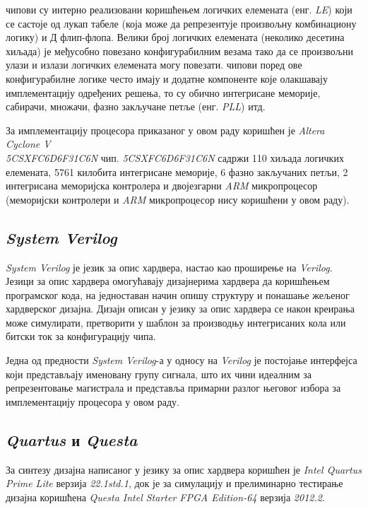  чипови су интерно реализовани коришћењем логичких елемената (енг. \textit{\acrfull{LE}}) који се састоје од лукап табеле (која може да репрезентује произвољну комбинациону логику) и Д флип-флопа.
Велики број логичких елемената (неколико десетина хиљада) је међусобно повезано конфигурабилним везама тако да се произвољни улази и излази логичких елемената могу повезати.
 чипови поред ове конфигурабилне логике често имају и додатне компоненте које олакшавају имплементацију одређених решења, то су обично интегрисане меморије, сабирачи, множачи, фазно закључане петље (енг. \textit{\acrfull{PLL}}) итд.

За имплементацију процесора приказаног у овом раду коришћен је \textit{Altera Cyclone V \\ 5CSXFC6D6F31C6N}\cite{cycv_hb}  чип.
\textit{5CSXFC6D6F31C6N} садржи 110 хиљада логичких елемената, 5761 килобита интегрисане меморије, 6 фазно закључаних петљи, 2 интегрисана меморијска контролера и двојезгарни \textit{ARM} микропроцесор (меморијски контролери и \textit{ARM} микропроцесор нису коришћени у овом раду). 

\subsection{\textit{System Verilog}}

\textit{System Verilog}\cite{sv_spec} је језик за опис хардвера, настао као проширење на \textit{Verilog}.
Језици за опис хардвера омогућавају дизајнерима хардвера да коришћењем програмског кода, на једноставан начин опишу структуру и понашање жељеног хардверског дизајна.
Дизајн описан у језику за опис хардвера се након креирања може симулирати, претворити у шаблон за производњу интегрисаних кола или битски ток за конфигурацију  чипа.

Једна од предности \textit{System Verilog}-а у односу на \textit{Verilog} је постојање интерфејса који представљају именовану групу сигнала, што их чини идеалним за репрезентовање магистрала и представља примарни разлог његовог избора за имплементацију процесора у овом раду.

\subsection{\textit{Quartus} и \textit{Questa}}

За синтезу дизајна написаног у језику за опис хардвера коришћен је \textit{Intel Quartus Prime Lite}\cite{quartus_man} верзија \textit{22.1std.1}, док је за симулацију и прелиминарно тестирање дизајна коришћена \textit{Questa Intel Starter FPGA Edition-64}\cite{questa_man} верзија \textit{2012.2}.



